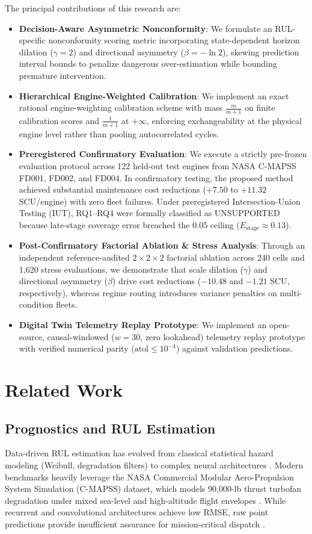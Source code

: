 \documentclass[conference,a4paper]{IEEEtran}
\begin{document}
The principal contributions of this research are:
\begin{itemize}
    \item \textbf{Decision-Aware Asymmetric Nonconformity}: We formulate an RUL-specific nonconformity scoring metric incorporating state-dependent horizon dilation ($\gamma=2$) and directional asymmetry ($\beta=-\ln 2$), skewing prediction interval bounds to penalize dangerous over-estimation while bounding premature intervention.
    \item \textbf{Hierarchical Engine-Weighted Calibration}: We implement an exact rational engine-weighting calibration scheme with mass $\frac{m}{m+1}$ on finite calibration scores and $\frac{1}{m+1}$ at $+\infty$, enforcing exchangeability at the physical engine level rather than pooling autocorrelated cycles.
    \item \textbf{Preregistered Confirmatory Evaluation}: We execute a strictly pre-frozen evaluation protocol across 122 held-out test engines from NASA C-MAPSS FD001, FD002, and FD004. In confirmatory testing, the proposed method achieved substantial maintenance cost reductions ($+7.50$ to $+11.32$ SCU/engine) with zero fleet failures. Under preregistered Intersection-Union Testing (IUT), RQ1--RQ4 were formally classified as UNSUPPORTED because late-stage coverage error breached the 0.05 ceiling ($E_{\text{stage}} \approx 0.13$).
    \item \textbf{Post-Confirmatory Factorial Ablation \& Stress Analysis}: Through an independent reference-audited $2 \times 2 \times 2$ factorial ablation across 240 cells and 1,620 stress evaluations, we demonstrate that scale dilation ($\gamma$) and directional asymmetry ($\beta$) drive cost reductions ($-10.48$ and $-1.21$ SCU, respectively), whereas regime routing introduces variance penalties on multi-condition fleets.
    \item \textbf{Digital Twin Telemetry Replay Prototype}: We implement an open-source, causal-windowed ($w=30$, zero lookahead) telemetry replay prototype with verified numerical parity ($\text{atol} \le 10^{-4}$) against validation predictions.
\end{itemize}

\section{Related Work}

\subsection{Prognostics and RUL Estimation}
Data-driven RUL estimation has evolved from classical statistical hazard modeling (Weibull, degradation filters) to complex neural architectures \cite{saxena2008damage}. Modern benchmarks heavily leverage the NASA Commercial Modular Aero-Propulsion System Simulation (C-MAPSS) dataset, which models 90,000-lb thrust turbofan degradation under mixed sea-level and high-altitude flight envelopes \cite{saxena2008damage, diao2026turbofan}. While recurrent and convolutional architectures achieve low RMSE, raw point predictions provide insufficient assurance for mission-critical dispatch \cite{wu2026research, belay2026digital}.
\end{document}
